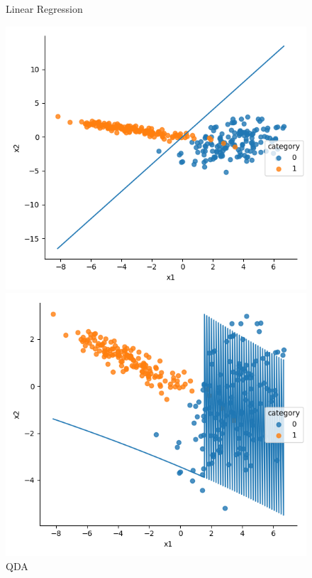 \documentclass[a4paper]{article}
\begin{document}
\begin{figure}[h]
\begin{minipage}{0,45\textwidth}
\end{minipage}
\begin{minipage}{0,45\textwidth}
\caption{Linear Regression}
\includegraphics[scale=.4]{b_lr.png}
\end{minipage}
\begin{minipage}{0,45\textwidth}
\caption{QDA}
\includegraphics[scale=.4]{b_qda.png}
\end{minipage}
\end{figure}
\end{document}

